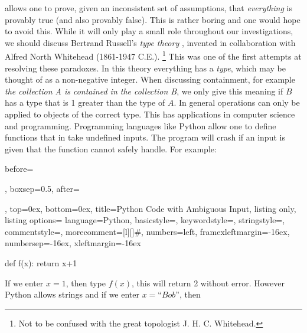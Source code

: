         allows one to prove, given an inconsistent set of assumptions, that
        \textit{everything} is provably true (and also provably false). This is
        rather boring and one would hope to avoid this. While it will only play
        a small role throughout our investigations, we should discuss
        Bertrand Russell's \textit{type theory}%
        , invented in collaboration with
        Alfred North Whitehead
        (1861-1947 C.E.).%
        \footnote{%
            Not to be confused with the great topologist J. H. C. Whitehead.
        }
        This was one of the first attempts at resolving these paradoxes. In this
        theory everything has a \textit{type}, which may be thought of as a
        non-negative integer. When discussing containment, for example
        \textit{the collection A is contained in the collection B}, we only
        give this meaning if $B$ has a type that is 1 greater than the type of
        $A$. In general operations can only be applied to objects of the correct
        type. This has applications in computer science and programming.
        Programming languages like Python allow one to define functions that in
        take undefined inputs. The program will crash if an input is given that
        the function cannot safely handle. For example:
        \par
        \begin{tcblisting}{
            before=\par\vspace{2ex},
            boxsep=0.5\topsep,
            after=\par\vspace{2ex},
            top=0ex,
            bottom=0ex,
            title=Python Code with Ambiguous Input,
            listing only,
            listing options={
                language=Python,
                basicstyle=\ttfamily,
                keywordstyle=\color{blue}\ttfamily,
                stringstyle=\color{red}\ttfamily,
                commentstyle=\color{green}\ttfamily,
                morecomment={[l][\color{magenta}]{\#}},
                numbers=left,
                framexleftmargin=-16ex,
                numbersep=-16ex,
                xleftmargin=-16ex
            }
        }
            def f(x):
                return x+1
        \end{tcblisting}
        If we enter $x=1$, then type $f(x)$, this will return 2 without error.
        However Python allows strings and if we enter $x=\textit{``Bob''}$, then
